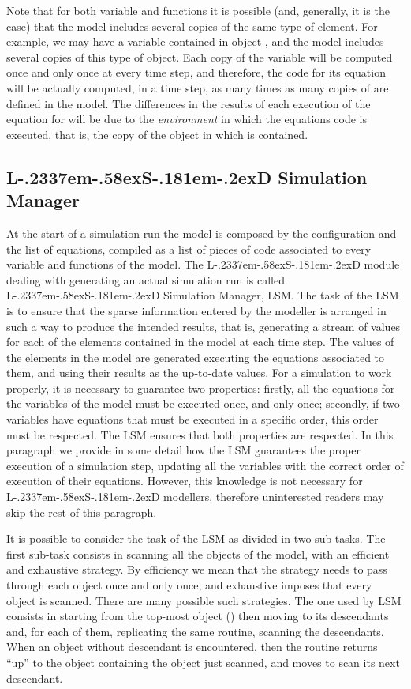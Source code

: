 \documentclass [11pt,a4paper] {book}
\def\LsD{{L\kern-.2337em\lower-.58ex\hbox{S}\kern-.181em\lower-.2ex\hbox{D}}\xspace}
\begin{document}
Note that for both variable and functions it is possible (and, generally, it is the case) that the model includes several copies of the same type of element. For example, we may have a variable  contained in object , and the model includes several copies of this type of object. Each copy of the variable  will be computed once and only once at every time step, and therefore, the code for its equation will be actually computed, in a time step, as many times as many copies of  are defined in the model. The differences in the results of each execution of the equation for  will be due to the \textit{environment} in which the equations code is executed, that is, the copy of the object in which  is contained.

\subsection{\LsD Simulation Manager}

At the start of a simulation run the model is composed by the configuration and the list of equations, compiled as a list of pieces of code associated to every variable and functions of the model. The \LsD module dealing with generating an actual simulation run is called \LsD Simulation Manager, LSM. The task of the LSM is to ensure that the sparse information entered by the modeller is arranged in such a way to produce the intended results, that is, generating a stream of values for each of the elements contained in the model at each time step. The values of the elements in the model are generated executing the equations associated to them, and using their results as the up-to-date values. For a simulation to work properly, it is necessary to guarantee two properties: firstly, all the equations for the variables of the model must be executed once, and only once; secondly, if two variables have equations that must be executed in a specific order, this order must be respected. The LSM ensures that both properties are respected. In this paragraph we provide in some detail how the LSM guarantees the proper execution of a simulation step, updating all the variables with the correct order of execution of their equations. However, this knowledge is not necessary for \LsD modellers, therefore uninterested readers may skip the rest of this paragraph.

It is possible to consider the task of the LSM as divided in two sub-tasks. The first sub-task consists in scanning all the objects of the model, with an efficient and exhaustive strategy. By efficiency we mean that the strategy needs to pass through each object once and only once, and exhaustive imposes that every object is scanned. There are many possible such strategies. The one used by LSM consists in starting from the top-most object () then moving to its descendants and, for each of them, replicating the same routine, scanning the descendants. When an object without descendant is encountered, then the routine returns ``up'' to the object containing the object just scanned, and moves to scan its next descendant. 
\end{document}
